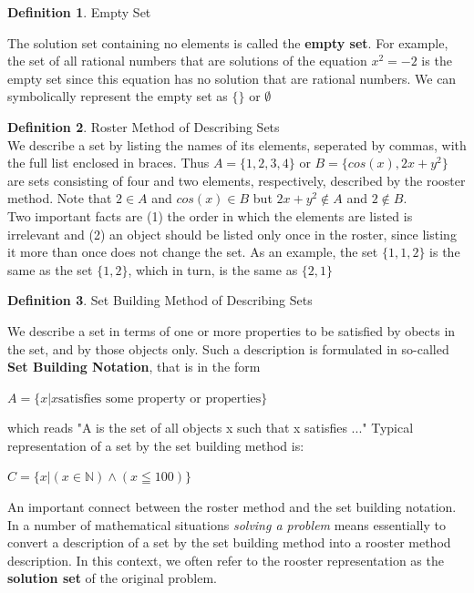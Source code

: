 \documentclass{book}
\theoremstyle{definition}
\newtheorem{definition}{Definition}[section]
\theoremstyle{remark}
\newcommand{\bb}[1]{\mathbb{#1}}
\begin{document}
\begin{definition}
Empty Set \\
\begin{tcolorbox}
    The solution set containing no elements is called the {\bf empty set}. For example, the set of all rational numbers that are solutions of the equation $x^2=-2$ is the empty set since this equation has no solution that are rational numbers. We can symbolically represent the empty set as $\{ \}$ or $\emptyset$ \\
\end{tcolorbox}
\end{definition}

\begin{definition}
Roster Method of Describing Sets \\

    We describe a set by listing the names of its elements, seperated by commas, with the full list enclosed in braces. Thus $A = \{1,2,3,4\}$ or $B = \{cos(x), 2x+y^2 \}$ are sets consisting of four and two elements, respectively, described by the rooster method. Note that $2 \in A$ and $cos(x) \in B$ but $2x+y^2 \notin A$ and $2 \notin B$. \\
    
    Two important facts are (1) the order in which the elements are listed is irrelevant and (2) an object should be listed only once in the roster, since listing it more than once does not change the set. As an example, the set $\{1,1,2\}$ is the same as the set $\{1,2\}$, which in turn, is the same as $\{2,1\}$

\end{definition}


\begin{definition}
Set Building Method of Describing Sets \\
    
    \begin{tcolorbox}
    We describe a set in terms of one or more properties to be satisfied by obects in the set, and by those objects only. Such a description is formulated in so-called {\bf Set Building Notation}, that is in the form 
    	\begin{center}
    		$A = \{ x | x \text{satisfies some property or properties} \}$
    	\end{center}
    which reads "A is the set of all objects x such that x satisfies ..." Typical representation of a set by the set building method is:
    	\begin{center}
    		$C = \{ x | (x \in \bb{N})\wedge(x \leqq 100) \}$
    	\end{center}	
    \end{tcolorbox}
    
    An important connect between the roster method and the set building notation. In a  number of mathematical situations {\it solving a problem} means essentially to convert a description of a set by the set building method into a rooster method description. In this context, we often refer to the rooster representation as the {\bf solution set} of the original problem.  
\end{definition}
\end{document}
